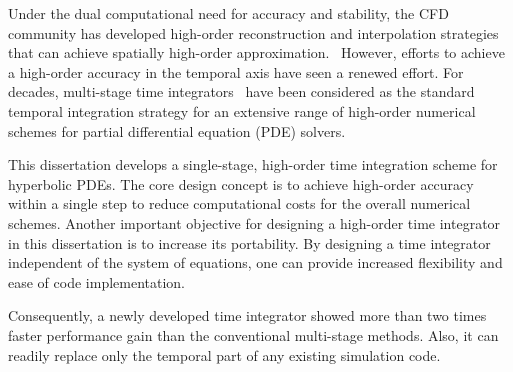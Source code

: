 Under the dual computational need for accuracy and stability,
the CFD community has developed high-order reconstruction and interpolation strategies
that can achieve spatially high-order
approximation.~\cite{woodward1984numerical,colella1984piecewise,liu1994weighted,jiang1996efficient,borges2008improved,castro2011high,mignone2010high,balsara2016efficient}
However, efforts to achieve a high-order accuracy in the temporal axis have seen a renewed effort.
For decades, multi-stage time integrators~\cite{gottlieb1998total,gottlieb2001strong,gottlieb2011strong}
have been considered as the standard temporal integration strategy
for an extensive range of high-order numerical schemes for partial differential equation (PDE) solvers.

This dissertation develops a single-stage, high-order time integration scheme for hyperbolic PDEs.
The core design concept is to achieve high-order accuracy within a single step
to reduce computational costs for the overall numerical schemes.
Another important objective for designing a high-order time integrator in this dissertation
is to increase its portability.
By designing a time integrator independent of the system of equations,
one can provide increased flexibility and ease of code implementation.

Consequently, a newly developed time integrator showed more than two times faster performance gain
than the conventional multi-stage methods.
Also, it can readily replace only the temporal part of any existing simulation code.
